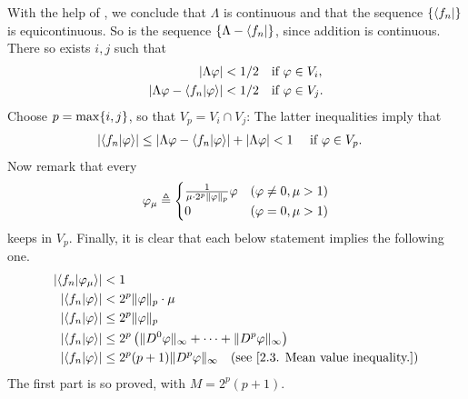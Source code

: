 %
With the help of , we conclude that %
%
  $\Lambda$ is continuous 
%
and that the sequence
%
  $\{\bra{f_n}\}$ %
%
is equicontinuous. 
%
So is the sequence %
%
  $\{\Lambda - \bra{f_n}\}$, %
%
since addition is continuous.
%
There so exists $i, j$ such that 
%
  \begin{align}
    \left\lvert 
      \Lambda \varphi 
    \right\rvert
      < 
    1/2 & \quad \text{if }\varphi\in V_i, \\
    \left\lvert 
      \Lambda\varphi - \bra{f_n}\ket{\varphi} 
    \right\rvert  
      < 
    1/2 & \quad \text{if } \varphi\in V_j.
  \end{align}
%
Choose $p = \max\{i, j\}$, so that $V_p = V_i \cap V_j$: %
The latter inequalities imply that %
%
  \begin{align}
    \left\lvert \bra{f_n}\ket{\phi} \right\rvert  & \leq 
      \magnitude{
        \Lambda\phi 
        - \bra{f_n }\ket{\phi} 
      }
      + 
      \magnitude{\Lambda \phi}
     < 1 \
       \quad\text{if } \phi\in V_p. %
  \end{align}
%
Now remark that every %
%
  \begin{align}
    \varphi_{\mu} \triangleq 
      \begin{cases}
        \frac{1}{\mu \cdot 2^{p} \|\varphi \|_p} \varphi & (\varphi \neq 0, \mu > 1)\\
        0                                          & (\varphi   =  0, \mu > 1) 
      \end{cases}
  \end{align}
%
keeps in $V_p$. Finally, %
it is clear that each below statement implies the following one.
%
  \begin{align}
    \lvert \langle {f_n}  | \varphi_{\mu} \rangle \rvert &  
    < 1 \\
    \left\lvert \bra{f_n}\ket{\varphi} \right\rvert &  
    < 2^{p}  \| \varphi \|_p \cdot \mu \\
    \left\lvert \bra{f_n}\ket{\varphi} \right\rvert & 
    \leq 2^{p} \| \varphi \|_p \\
     \left\lvert \bra{f_n}\ket{\varphi} \right\rvert &
     \leq 2^{p} \left(\| D^0 \varphi \|_\infty 
       + 
         \cdots 
      + 
        \| D^p \varphi \|_\infty\right)\\
    \label{2.3. Bound with p and M (theoritical).}
     \left\lvert \bra{f_n}\ket{\varphi} \right\rvert &
     \leq 2^{p} (p+1) \| D^p \varphi \|_\infty  
     \quad (\text{see } \ref{2.3. Mean value inequality.})
  \end{align}
%
The first part is so proved, with $ M= 2^{p}(p+1)$. %
\newline\newline\noindent
%
